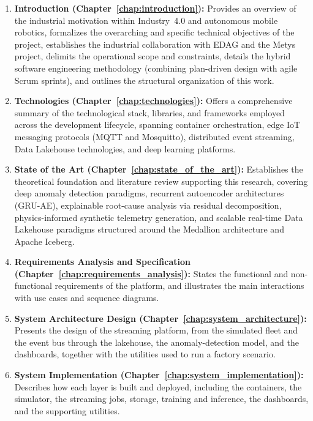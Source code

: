 \begin{enumerate}
    \item \textbf{Introduction (Chapter~\ref{chap:introduction}):} Provides an overview of the industrial motivation within Industry~4.0 and autonomous mobile robotics, formalizes the overarching and specific technical objectives of the project, establishes the industrial collaboration with EDAG and the Metys project, delimits the operational scope and constraints, details the hybrid software engineering methodology (combining plan-driven design with agile Scrum sprints), and outlines the structural organization of this work.
    
    \item \textbf{Technologies (Chapter~\ref{chap:technologies}):} Offers a comprehensive summary of the technological stack, libraries, and frameworks employed across the development lifecycle, spanning container orchestration, edge IoT messaging protocols (MQTT and Mosquitto), distributed event streaming, Data Lakehouse technologies, and deep learning platforms.
    
    \item \textbf{State of the Art (Chapter~\ref{chap:state_of_the_art}):} Establishes the theoretical foundation and literature review supporting this research, covering deep anomaly detection paradigms, recurrent autoencoder architectures (GRU-AE), explainable root-cause analysis via residual decomposition, physics-informed synthetic telemetry generation, and scalable real-time Data Lakehouse paradigms structured around the Medallion architecture and Apache Iceberg.
    
    \item \textbf{Requirements Analysis and Specification (Chapter~\ref{chap:requirements_analysis}):} States the functional and non-functional requirements of the platform, and illustrates the main interactions with use cases and sequence diagrams.
    
    \item \textbf{System Architecture Design (Chapter~\ref{chap:system_architecture}):} Presents the design of the streaming platform, from the simulated fleet and the event bus through the lakehouse, the anomaly-detection model, and the dashboards, together with the utilities used to run a factory scenario.
    
    \item \textbf{System Implementation (Chapter~\ref{chap:system_implementation}):} Describes how each layer is built and deployed, including the containers, the simulator, the streaming jobs, storage, training and inference, the dashboards, and the supporting utilities.
    

\end{enumerate}
